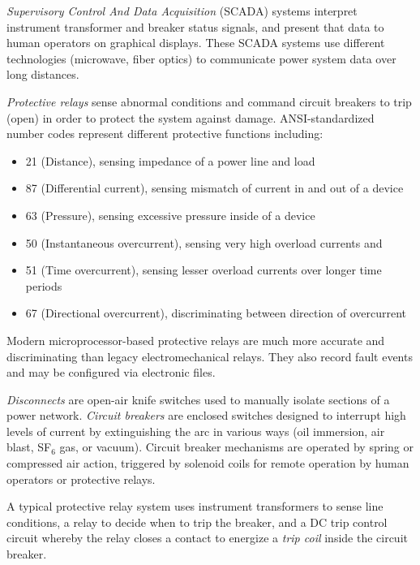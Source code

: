 \vskip 10pt

{\it Supervisory Control And Data Acquisition} (SCADA) systems interpret instrument transformer and breaker status signals, and present that data to human operators on graphical displays.  These SCADA systems use different technologies (microwave, fiber optics) to communicate power system data over long distances.

\vskip 10pt

{\it Protective relays} sense abnormal conditions and command circuit breakers to trip (open) in order to protect the system against damage.  ANSI-standardized number codes represent different protective functions including:

\begin{itemize}
\item{} 21 (Distance), sensing impedance of a power line and load
\item{} 87 (Differential current), sensing mismatch of current in and out of a device
\item{} 63 (Pressure), sensing excessive pressure inside of a device
\item{} 50 (Instantaneous overcurrent), sensing very high overload currents and
\item{} 51 (Time overcurrent), sensing lesser overload currents over longer time periods
\item{} 67 (Directional overcurrent), discriminating between direction of overcurrent
\end{itemize}

Modern microprocessor-based protective relays are much more accurate and discriminating than legacy electromechanical relays.  They also record fault events and may be configured via electronic files.

\vskip 10pt

{\it Disconnects} are open-air knife switches used to manually isolate sections of a power network.  {\it Circuit breakers} are enclosed switches designed to interrupt high levels of current by extinguishing the arc in various ways (oil immersion, air blast, SF$_{6}$ gas, or vacuum).  Circuit breaker mechanisms are operated by spring or compressed air action, triggered by solenoid coils for remote operation by human operators or protective relays.

\vskip 10pt

A typical protective relay system uses instrument transformers to sense line conditions, a relay to decide when to trip the breaker, and a DC trip control circuit whereby the relay closes a contact to energize a {\it trip coil} inside the circuit breaker.









